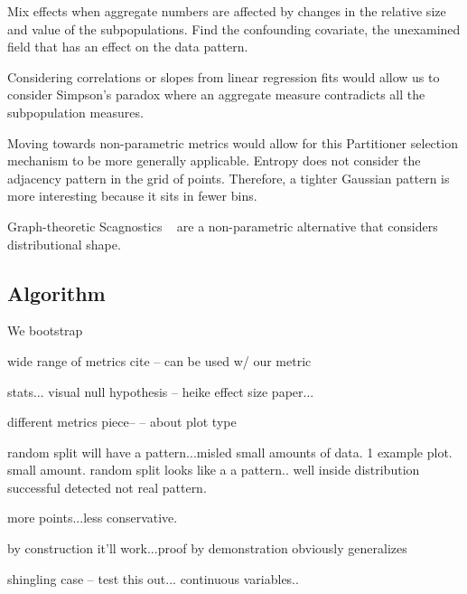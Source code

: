 Mix effects when aggregate numbers are affected by changes in the relative size and value of the subpopulations. Find the confounding covariate, the unexamined field that has an effect on the data pattern.

Considering correlations or slopes from linear regression fits would allow us to consider Simpson's paradox where an aggregate measure contradicts all the subpopulation measures.

Moving towards non-parametric metrics would allow for this Partitioner selection mechanism to be more generally applicable. 
Entropy does not consider the adjacency pattern in the grid of points. Therefore, a tighter Gaussian pattern is more interesting because it sits in fewer bins.

Graph-theoretic Scagnostics ~\cite{Wilkinson2005} are a non-parametric alternative that considers distributional shape. 

\subsection{Algorithm}
We bootstrap 



wide range of metrics cite -- can be used w/ our metric

stats...
visual null hypothesis -- heike 
effect size paper...


different metrics piece-- -- about plot type

random split will have a pattern...misled small amounts of data. 1 example plot. small amount. random split looks like a a pattern.. well inside distribution successful detected not real pattern.

more points...less conservative.

by construction it'll work...proof by demonstration
obviously generalizes

shingling case -- test this out...
continuous variables..